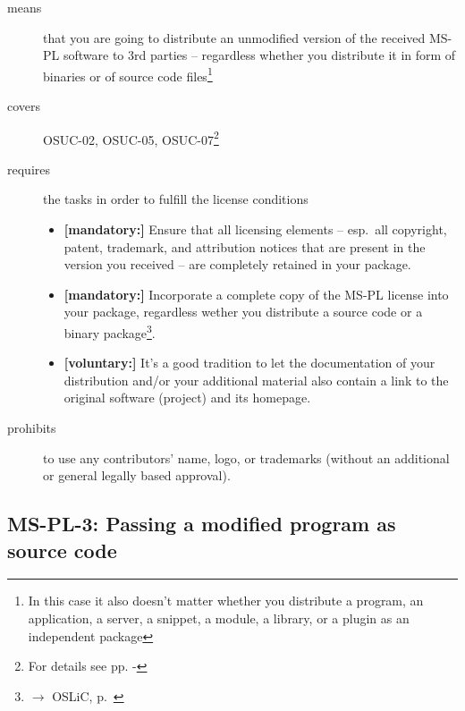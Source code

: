 \begin{description}
\item[means] that you are going to distribute an unmodified version of the
received MS-PL software to 3rd parties -- regardless whether you distribute it
in form of binaries or of source code files\footnote{In this case it also
doesn't matter whether you distribute a program, an application, a server, a
snippet, a module, a library, or a plugin as an independent package}

\item[covers] OSUC-02, OSUC-05, OSUC-07\footnote{For details see pp.
\pageref{OSUC-02-DEF} - \pageref{OSUC-07-DEF}}

\item[requires] the tasks in order to fulfill the license conditions
\begin{itemize}
  \item \textbf{[mandatory:]} Ensure that all licensing elements -- esp.\ all
  copyright, patent, trademark, and attribution notices that are present in the
  version you received -- are completely retained in your package.
  
  \item \textbf{[mandatory:]} Incorporate a complete copy of the MS-PL license
  into your package, regardless wether you distribute a source code or a binary
  package\footnote{$\rightarrow$ OSLiC, p.\ \pageref{MsplSourceBinHint}}.
  
  \item \textbf{[voluntary:]} It's a good tradition to let the documentation of
  your distribution and/or your additional material also contain a link to the
  original software (project) and its homepage.
\end{itemize}

\item[prohibits] to use any contributors' name, logo, or trademarks (without an
additional or general legally based approval).

\end{description}

\subsection{MS-PL-3: Passing a modified program as source code}
\label{OSUC-04-MS-PL}

